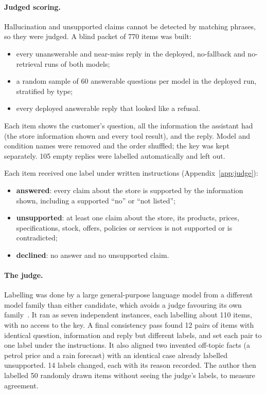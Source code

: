 \documentclass[11pt,a4paper]{article}
\begin{document}
\paragraph{Judged scoring.} Hallucination and unsupported claims cannot be detected by matching phrases, so they were
judged. A blind packet of 770 items was built:
\begin{itemize}
  \item every unanswerable and near-miss reply in the deployed, no-fallback and no-retrieval runs of both models;
  \item a random sample of 60 answerable questions per model in the deployed run, stratified by type;
  \item every deployed answerable reply that looked like a refusal.
\end{itemize}
Each item shows the customer's question, all the information the assistant had (the store information shown and every
tool result), and the reply. Model and condition names were removed and the order shuffled; the key was kept separately.
105 empty replies were labelled automatically and left out.

Each item received one label under written instructions (Appendix~\ref{app:judge}):
\begin{itemize}
  \item \textbf{answered}: every claim about the store is supported by the information shown, including a supported
        ``no'' or ``not listed'';
  \item \textbf{unsupported}: at least one claim about the store, its products, prices, specifications, stock, offers,
        policies or services is not supported or is contradicted;
  \item \textbf{declined}: no answer and no unsupported claim.
\end{itemize}

\paragraph{The judge.} Labelling was done by a large general-purpose language model from a different model family than
either candidate, which avoids a judge favouring its own family~\cite{llmjudge}. It ran as seven independent instances,
each labelling about 110 items, with no access to the key. A final consistency pass found 12 pairs of items with
identical question, information and reply but different labels, and set each pair to one label under the instructions.
It also aligned two invented off-topic facts (a petrol price and a rain forecast) with an identical case already labelled
unsupported. 14 labels changed, each with its reason recorded. The author then labelled 50 randomly drawn items without
seeing the judge's labels, to measure agreement.
\end{document}

